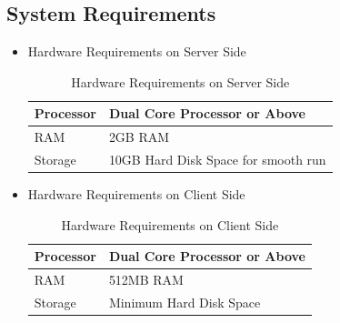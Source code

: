 \documentclass{article}
\begin{document}
\begin{flushleft}
        \subsection{System Requirements}
        \begin{itemize}
            \item Hardware Requirements on Server Side
           \begin{center}
           \begin{table}[!ht]
           \renewcommand\thetable{1.5.1}
               \centering
               \caption{Hardware Requirements on Server Side}
               \label{}
              \begin{tabular}{ | m{5em} | m{7cm} | }
           
            \hline
             Processor & Dual Core Processor or Above  \\ \hline
             RAM & 2GB RAM   \\  \hline
             Storage & 10GB Hard Disk Space for smooth run  \\  \hline
            \end{tabular}
            
           \end{table}
            
            \end{center}
            
            
          \item Hardware Requirements on Client Side 
          \begin{center}
          \begin{table}[!ht]
          \renewcommand\thetable{1.5.2}
              \centering
              \caption{Hardware Requirements on Client Side}
              \label{ }
             \begin{tabular}{ | m{5em} | m{7cm} | }
           
            \hline
             Processor & Dual Core Processor or Above  \\ \hline
             RAM & 512MB RAM   \\  \hline
             Storage & Minimum Hard Disk Space  \\  \hline
            \end{tabular}
              
          \end{table}
            
            \end{center}
            

\end{itemize}
\end{flushleft}
\end{document}
